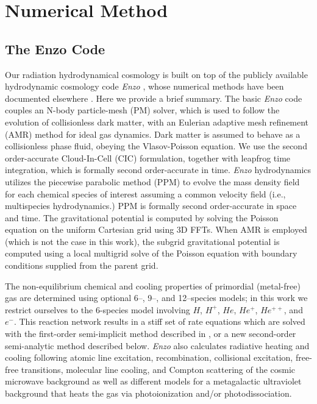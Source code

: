 
\section{Numerical Method}
\label{sec:numerical}


\subsection{The Enzo Code}

Our radiation hydrodynamical cosmology is built on top of the publicly available hydrodynamic cosmology code {\em Enzo} \citep{EnzoWeb}, whose numerical methods have been documented elsewhere \citep{OSheaEtAl2004,NormanEtAl2007}. Here we provide a brief summary. 
The basic {\em Enzo} code couples an N-body particle-mesh (PM) solver,
which is used to follow the evolution of collisionless dark matter, with an
Eulerian adaptive mesh refinement (AMR) method for ideal gas dynamics. 
Dark matter is assumed to behave as a collisionless phase fluid, obeying the Vlasov-Poisson equation. We use the second order-accurate Cloud-In-Cell (CIC) formulation, together with leapfrog time integration, which is formally second order-accurate in time. 
{\em Enzo} hydrodynamics utilizes the piecewise parabolic method (PPM) \citep{ColellaWoodward1984}
to evolve the mass density field for each chemical species of interest assuming a common velocity field (i.e., multispecies hydrodynamics.) PPM is formally second order-accurate in space and time. 
The gravitational potential is computed by solving the Poisson
equation on the uniform Cartesian grid using 3D FFTs. When AMR is
employed (which is not the case in this work), the subgrid
gravitational potential is computed using a local multigrid solve of
the Poisson equation with boundary conditions supplied from the parent
grid.  

The non-equilibrium chemical and cooling properties of primordial (metal-free) gas
are determined using optional 6--, 9--, and 12--species models; in this work we restrict ourselves
to the 6-species model involving 
$H$, $H^+$, $He$, $He^+$, $He^{++}$, and $e^-$.  This reaction network
results in a stiff set of rate equations which are solved with the
first-order semi-implicit method described in \cite{Anninos97}, or a
new second-order semi-analytic method described below.  
{\em Enzo} also calculates radiative heating and cooling following atomic line excitation, recombination,
collisional excitation, free-free transitions, molecular line cooling, and Compton
scattering of the cosmic microwave background as well as different models for a metagalactic
ultraviolet background that heats the gas via photoionization and/or photodissociation. 

